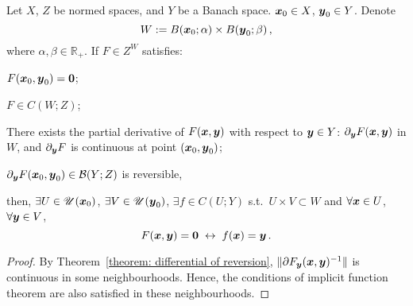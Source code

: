 \documentclass[openany]{book}
\begin{document}
\begin{theorem}
	\label{theorem: continuity of implicit function}
	Let $X$, $Z$ be normed spaces, and $Y$ be a Banach space.
	$\boldsymbol{x}_0 \in X$, $\boldsymbol{y}_0 \in Y$. Denote
	\begin{equation*}
		W := B(\boldsymbol{x}_0; \alpha) \times B(\boldsymbol{y}_0; \beta)\,,
	\end{equation*}
	where $\alpha, \beta \in \mathbb R_+$.
	If $F \in Z^W$ satisfies:
	\begin{conditionlist}[label=\alph*)]
		\item $F(\boldsymbol{x}_0, \boldsymbol{y}_0) = \boldsymbol{0}$;
		\item $F \in C (W; Z)$; 
		\item There exists the partial derivative of $F(\boldsymbol{x}, \boldsymbol{y})$ with respect to $\boldsymbol{y} \in Y$: $\partial_{\boldsymbol{y}} F(\boldsymbol{x}, \boldsymbol{y})$ in $W$, and $\partial_{\boldsymbol{y}} F$ is continuous at point $(\boldsymbol{x}_0, \boldsymbol{y}_0)$;
		\item $\partial_{\boldsymbol{y}} F(\boldsymbol{x}_0, \boldsymbol{y}_0) \in \mathcal B(Y; Z)$ is reversible,
	\end{conditionlist}
	then, $\exists U \in \mathscr U(\boldsymbol{x}_0)$, $\exists V \in \mathscr U(\boldsymbol{y}_0)$, $\exists f \in C(U; Y)$ s.t.\ $U \times V \subset W$ and $\forall \boldsymbol{x} \in U$, $\forall \boldsymbol{y} \in V$, 
	\begin{equation*}
		F(\boldsymbol{x}, \boldsymbol{y}) = \boldsymbol{0}
		\;\leftrightarrow\;
		f(\boldsymbol{x}) = \boldsymbol{y}\,.
	\end{equation*}
\end{theorem}
\begin{proof}
	By Theorem~\ref{theorem: differential of reversion}, $\|\partial F_{\boldsymbol{y}}(\boldsymbol{x}, \boldsymbol{y})^{-1}\|$ is continuous in some neighbourhoods. 
	Hence, the conditions of implicit function theorem are also satisfied in these neighbourhoods.
\end{proof}
\end{document}
